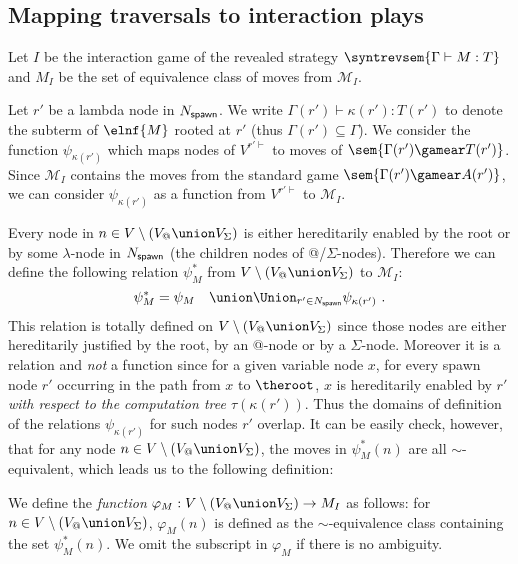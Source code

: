 \subsection{Mapping traversals to interaction plays}

    Let $I$ be the interaction game of the revealed strategy $\syntrevsem{\Gamma \vdash M : T}$ and
    $M_I$ be the set of equivalence class of moves from $\mathcal{M}_I$.

    Let $r'$ be a lambda node in $N_{\sf spawn}$. We write $\Gamma(r') \vdash \kappa(r') : T(r')$ to denote the subterm of $\elnf{M}$ rooted at $r'$ (thus $\Gamma(r')\subseteq \Gamma$).
    We consider the function $\psi_{\kappa(r')}$ which maps nodes of $V^{r'\vdash}$
    to moves of $\sem{\Gamma(r') \gamear T(r')}$. Since $\mathcal{M}_I$ contains the
    moves from the standard game $\sem{\Gamma(r') \gamear A(r')}$, we can consider $\psi_{\kappa(r')}$ as a function from $V^{r'\vdash}$ to $\mathcal{M}_I$.

    Every node in $n \in V\setminus (V_@ \union V_\Sigma)$ is either hereditarily enabled by the root or by some $\lambda$-node in $N_{\sf spawn}$ (the children nodes of @/$\Sigma$-nodes). Therefore we can define the following relation $\psi^*_M$ from
    $V\setminus (V_@ \union V_\Sigma)$ to $\mathcal{M}_I$:
    $$ \psi^*_M = \psi_{M} \quad \union \Union_{r' \in N_{\sf spawn}} \psi_{\kappa(r')} \ .$$
    This relation is totally defined on $V\setminus (V_@ \union V_\Sigma)$ since those nodes are either hereditarily justified by the root, by an @-node or by a $\Sigma$-node. Moreover it is a relation and \emph{not} a function since for a given variable node $x$,
for every spawn node $r'$ occurring in the path from $x$ to $\theroot$, $x$ is hereditarily enabled by $r'$ \emph{with respect to the computation tree $\tau(\kappa(r'))$}. Thus the domains of definition of the relations $\psi_{\kappa(r')}$ for such nodes $r'$ overlap.    It can be easily check, however, that for any node $n \in V\setminus (V_@ \union V_\Sigma)$,
    the moves in $\psi^*_M (n)$ are all $\sim$-equivalent, which leads us to the following definition:

\begin{definition}
    \label{def:phi mapping}
    We define the \emph{function}
    $\varphi_M:V\setminus (V_@ \union V_\Sigma) \rightarrow M_I$ as follows: for $n \in V\setminus (V_@ \union V_\Sigma)$,     $\varphi_M(n)$ is defined as the $\sim$-equivalence class containing the set $\psi^*_M (n)$. We omit the subscript in $\varphi_M$ if there is no ambiguity.
\end{definition}


